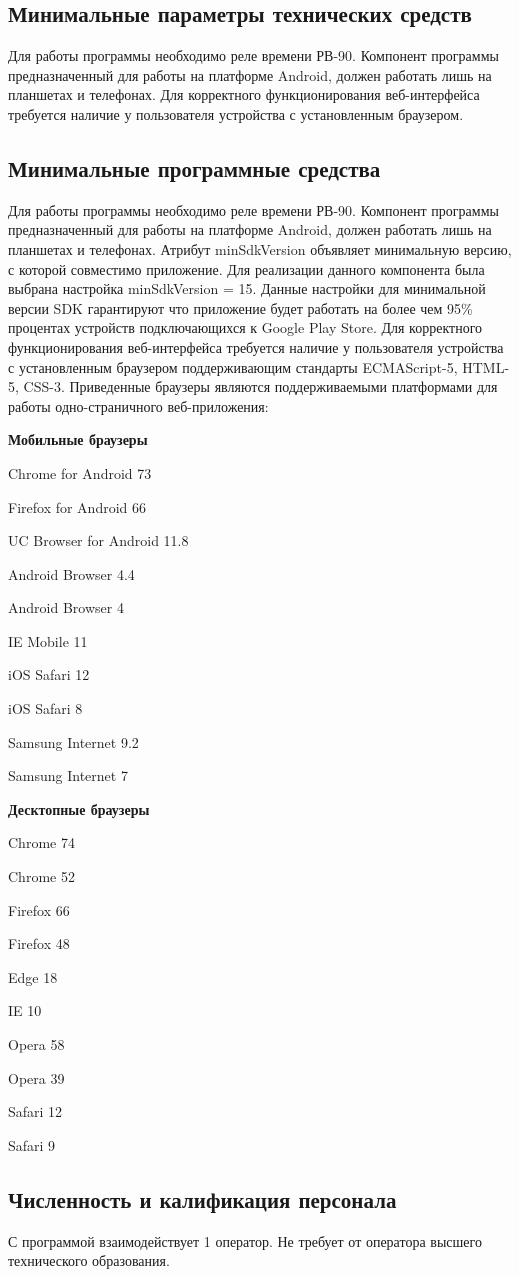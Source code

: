 \subsection{Минимальные параметры технических средств}
Для работы программы необходимо реле времени РВ-90. Компонент программы предназначенный для работы на платформе Android, должен работать лишь на планшетах и телефонах.
Для корректного функционирования веб-интерфейса требуется наличие у пользователя устройства с установленным браузером.


\subsection{Минимальные программные средства}
Для работы программы необходимо реле времени РВ-90. Компонент программы предназначенный для работы на платформе Android, должен работать лишь на планшетах и телефонах. 
Атрибут minSdkVersion объявляет минимальную версию, с которой совместимо приложение.
Для реализации данного компонента была выбрана настройка minSdkVersion = 15. Данные настройки для минимальной версии SDK гарантируют что приложение будет работать на более чем 95\% процентах устройств подключающихся к Google Play Store.
Для корректного функционирования веб-интерфейса требуется наличие у пользователя устройства с установленным браузером поддерживающим стандарты ECMAScript-5, HTML-5, CSS-3. Приведенные браузеры являются поддерживаемыми платформами для работы одно-страничного веб-приложения:

\textbf{Мобильные браузеры}
\begin{my_enumerate}
\item Chrome for Android 73
\item Firefox for Android 66
\item UC Browser for Android 11.8
\item Android Browser 4.4
\item Android Browser 4
\item IE Mobile 11
\item iOS Safari 12
\item iOS Safari 8
\item Samsung Internet 9.2
\item Samsung Internet 7
\end{my_enumerate}

\textbf{Десктопные браузеры}
\begin{my_enumerate}
\item Chrome 74
\item Chrome 52
\item Firefox 66
\item Firefox 48
\item Edge 18
\item IE 10
\item Opera 58
\item Opera 39
\item Safari 12
\item Safari 9
\end{my_enumerate}


\subsection{Численность и калификация персонала}
С программой взаимодействует 1 оператор. Не требует от оператора высшего технического образования. 
